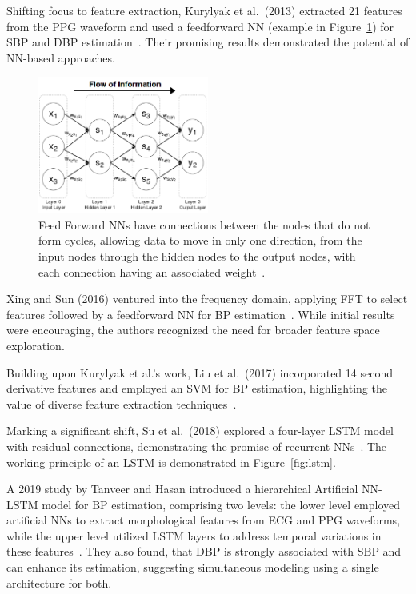 Shifting focus to feature extraction, Kurylyak et al.\ (2013) extracted 21 features from the PPG waveform and used a feedforward \ac{NN} (example in Figure~\ref{fig:ffnn}) for SBP and DBP estimation~\cite{kurylyakNeuralNetworkbasedMethod2013}.
Their promising results demonstrated the potential of NN-based approaches.

\begin{figure}[h]
    \centering
    \includegraphics[width=0.5\textwidth]{images/ml/ffnn}
    \captionsetup{format=plain, justification=raggedright}
    \caption{\small Feed Forward NNs have connections between the nodes that do not form cycles, allowing data to move in only one direction, from the input nodes through the hidden nodes to the output nodes, with each connection having an associated weight~\cite{FeedforwardNeuralNetworks}.}
    \label{fig:ffnn}
\end{figure}

Xing and Sun (2016) ventured into the frequency domain, applying FFT to select features followed by a feedforward NN for BP estimation~\cite{xingOpticalBloodPressure2016}.
While initial results were encouraging, the authors recognized the need for broader feature space exploration.

Building upon Kurylyak et al.'s work, Liu et al.\ (2017) incorporated 14 second derivative features and employed an SVM for BP estimation, highlighting the value of diverse feature extraction techniques~\cite{liuIntegratedNavigationTethered2017}.

Marking a significant shift, Su et al.\ (2018) explored a four-layer \ac{LSTM} model with residual connections, demonstrating the promise of recurrent NNs~\cite{suLongtermBloodPressure2018}.
The working principle of an LSTM is demonstrated in Figure~\ref{fig:lstm}.

A 2019 study by Tanveer and Hasan introduced a hierarchical Artificial NN-LSTM model for BP estimation, comprising two levels: the lower level employed artificial NNs to extract morphological features from ECG and PPG waveforms, while the upper level utilized LSTM layers to address temporal variations in these features~\cite{tanveerCufflessBloodPressure2019}.
They also found, that DBP is strongly associated with SBP and can enhance its estimation, suggesting simultaneous modeling using a single architecture for both.

